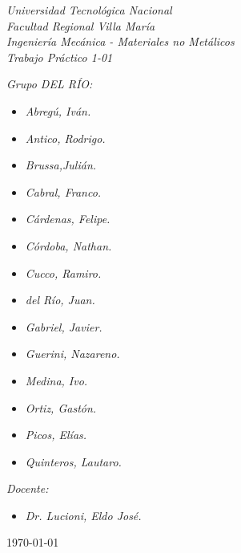 \begin{titlepage}
	
	\begin{center}
		{\huge \textit{Universidad Tecnológica Nacional}}\\
        \vspace{0.5cm}
		{\LARGE \textit{Facultad Regional Villa María}}\\
		\vspace{1.5cm}
        {\LARGE{\textit{Ingeniería Mecánica - Materiales no Metálicos}}}\\
		\vspace{1.5cm}
        \LARGE{\textit{Trabajo Práctico 1-01}}
	\end{center}
	
	\vfill

    \textit{Grupo DEL RÍO:}
	\begin{itemize}
		\item \textit{Abregú, Iván.}
		\item \textit{Antico, Rodrigo.}
		\item \textit{Brussa,Julián.}
		\item \textit{Cabral, Franco.}
        \item \textit{Cárdenas, Felipe.}
        \item \textit{Córdoba, Nathan.}
        \item \textit{Cucco, Ramiro.}
        \item \textit{del Río, Juan.}
        \item \textit{Gabriel, Javier.}
        \item \textit{Guerini, Nazareno.}
        \item \textit{Medina, Ivo.}
        \item \textit{Ortiz, Gastón.}
        \item \textit{Picos, Elías.}
        \item \textit{Quinteros, Lautaro.}
	\end{itemize}
    
	\textit{Docente:}
	\begin{itemize}
		\item \textit{Dr. Lucioni, Eldo José.}
	\end{itemize}
	\centering
	\today
	
\end{titlepage}